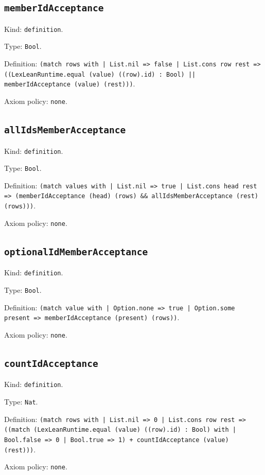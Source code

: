 \documentclass[11pt]{article}
\begin{document}
\subsection*{\texttt{memberIdAcceptance}}
\noindent Kind: \texttt{definition}.\par
\noindent Type: \texttt{Bool}.\par
\noindent Definition: \texttt{(match rows with | List.nil => false | List.cons row rest => ((LexLeanRuntime.equal (value) ((row).id) : Bool) || memberIdAcceptance (value) (rest)))}.\par
\noindent Axiom policy: \texttt{none}.\par
\subsection*{\texttt{allIdsMemberAcceptance}}
\noindent Kind: \texttt{definition}.\par
\noindent Type: \texttt{Bool}.\par
\noindent Definition: \texttt{(match values with | List.nil => true | List.cons head rest => (memberIdAcceptance (head) (rows) \&\& allIdsMemberAcceptance (rest) (rows)))}.\par
\noindent Axiom policy: \texttt{none}.\par
\subsection*{\texttt{optionalIdMemberAcceptance}}
\noindent Kind: \texttt{definition}.\par
\noindent Type: \texttt{Bool}.\par
\noindent Definition: \texttt{(match value with | Option.none => true | Option.some present => memberIdAcceptance (present) (rows))}.\par
\noindent Axiom policy: \texttt{none}.\par
\subsection*{\texttt{countIdAcceptance}}
\noindent Kind: \texttt{definition}.\par
\noindent Type: \texttt{Nat}.\par
\noindent Definition: \texttt{(match rows with | List.nil => 0 | List.cons row rest => ((match (LexLeanRuntime.equal (value) ((row).id) : Bool) with | Bool.false => 0 | Bool.true => 1) + countIdAcceptance (value) (rest)))}.\par
\noindent Axiom policy: \texttt{none}.\par
\end{document}
